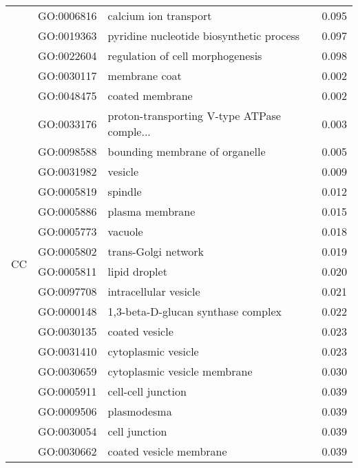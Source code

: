 \begin{longtable}{lllr}
   & GO:0006816 &                        calcium ion transport &         0.095 \\
   & GO:0019363 &     pyridine nucleotide biosynthetic process &         0.097 \\
   & GO:0022604 &             regulation of cell morphogenesis &         0.098 \\
\cline{1-4}
\multirow{38}{*}{CC} & GO:0030117 &                                membrane coat &         0.002 \\
   & GO:0048475 &                              coated membrane &         0.002 \\
   & GO:0033176 &  proton-transporting V-type ATPase comple... &         0.003 \\
   & GO:0098588 &               bounding membrane of organelle &         0.005 \\
   & GO:0031982 &                                      vesicle &         0.009 \\
   & GO:0005819 &                                      spindle &         0.012 \\
   & GO:0005886 &                              plasma membrane &         0.015 \\
   & GO:0005773 &                                      vacuole &         0.018 \\
   & GO:0005802 &                          trans-Golgi network &         0.019 \\
   & GO:0005811 &                                lipid droplet &         0.020 \\
   & GO:0097708 &                        intracellular vesicle &         0.021 \\
   & GO:0000148 &           1,3-beta-D-glucan synthase complex &         0.022 \\
   & GO:0030135 &                               coated vesicle &         0.023 \\
   & GO:0031410 &                          cytoplasmic vesicle &         0.023 \\
   & GO:0030659 &                 cytoplasmic vesicle membrane &         0.030 \\
   & GO:0005911 &                           cell-cell junction &         0.039 \\
   & GO:0009506 &                                  plasmodesma &         0.039 \\
   & GO:0030054 &                                cell junction &         0.039 \\
   & GO:0030662 &                      coated vesicle membrane &         0.039 \\

\end{longtable}
